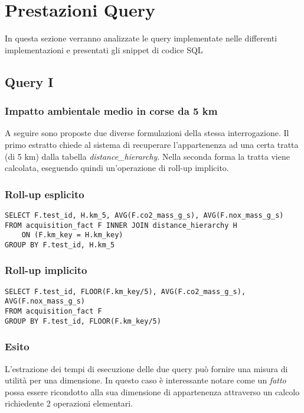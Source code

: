 \section{Prestazioni Query}
In questa sezione verranno analizzate le query implementate nelle differenti implementazioni e presentati gli snippet di codice SQL

\subsection{Query I}
\subsubsection{Impatto ambientale medio in corse da 5 km}
A seguire sono proposte due diverse formulazioni della stessa interrogazione. Il primo estratto chiede al sistema di recuperare l'appartenenza ad una certa tratta (di 5 km) dalla tabella \textit{distance\_hierarchy}. Nella seconda forma la tratta viene calcolata, eseguendo quindi un'operazione di roll-up implicito.
\subsubsection{Roll-up esplicito}
\begin{lstlisting}[language=mySQL]
SELECT F.test_id, H.km_5, AVG(F.co2_mass_g_s), AVG(F.nox_mass_g_s)
FROM acquisition_fact F INNER JOIN distance_hierarchy H
	ON (F.km_key = H.km_key)
GROUP BY F.test_id, H.km_5
\end{lstlisting}

\subsubsection{Roll-up implicito}
\begin{lstlisting}[language=mySQL]
SELECT F.test_id, FLOOR(F.km_key/5), AVG(F.co2_mass_g_s), AVG(F.nox_mass_g_s)
FROM acquisition_fact F
GROUP BY F.test_id, FLOOR(F.km_key/5)
\end{lstlisting}

\subsubsection{Esito}
L'estrazione dei tempi di esecuzione delle due query può fornire una misura di utilità per una dimensione. In questo caso è interessante notare come un \textit{fatto} possa essere ricondotto alla sua dimensione di appartenenza attraverso un calcolo richiedente 2 operazioni elementari.


